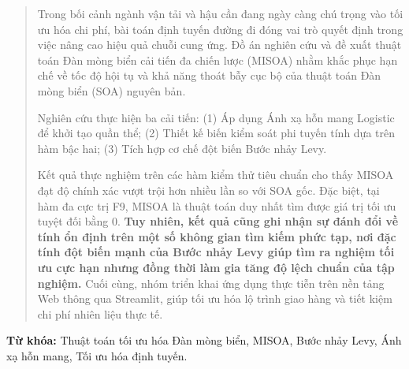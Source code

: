 \documentclass[12pt, a4paper]{article}
\begin{document}
\begin{quotation}
\noindent
Trong bối cảnh ngành vận tải và hậu cần đang ngày càng chú trọng vào tối ưu hóa chi phí, bài toán định tuyến đường đi đóng vai trò quyết định trong việc nâng cao hiệu quả chuỗi cung ứng. Đồ án nghiên cứu và đề xuất thuật toán Đàn mòng biển cải tiến đa chiến lược (MISOA) nhằm khắc phục hạn chế về tốc độ hội tụ và khả năng thoát bẫy cục bộ của thuật toán Đàn mòng biển (SOA) nguyên bản.

Nghiên cứu thực hiện ba cải tiến: (1) Áp dụng Ánh xạ hỗn mang Logistic để khởi tạo quần thể; (2) Thiết kế biến kiểm soát phi tuyến tính dựa trên hàm bậc hai; (3) Tích hợp cơ chế đột biến Bước nhảy Levy. 

Kết quả thực nghiệm trên các hàm kiểm thử tiêu chuẩn cho thấy MISOA đạt độ chính xác vượt trội hơn nhiều lần so với SOA gốc. Đặc biệt, tại hàm đa cực trị F9, MISOA là thuật toán duy nhất tìm được giá trị tối ưu tuyệt đối bằng 0. \textbf{Tuy nhiên, kết quả cũng ghi nhận sự đánh đổi về tính ổn định trên một số không gian tìm kiếm phức tạp, nơi đặc tính đột biến mạnh của Bước nhảy Levy giúp tìm ra nghiệm tối ưu cực hạn nhưng đồng thời làm gia tăng độ lệch chuẩn của tập nghiệm.} Cuối cùng, nhóm triển khai ứng dụng thực tiễn trên nền tảng Web thông qua Streamlit, giúp tối ưu hóa lộ trình giao hàng và tiết kiệm chi phí nhiên liệu thực tế.
\end{quotation}

\vspace{0.5cm}
\noindent
\textbf{Từ khóa:} Thuật toán tối ưu hóa Đàn mòng biển, MISOA, Bước nhảy Levy, Ánh xạ hỗn mang, Tối ưu hóa định tuyến.

\newpage
\tableofcontents

\newpage
{}
{}
\listoffigures

\newpage
{}
{}
\listoftables

\newpage
{}
\end{document}
